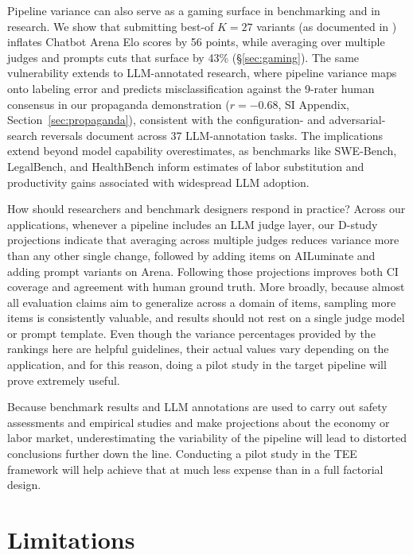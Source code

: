 \documentclass{article}
\begin{document}
Pipeline variance can also serve as a gaming surface in benchmarking and in research. We show that submitting best-of $K{=}27$ variants (as documented in \citet{singh2025leaderboard}) inflates Chatbot Arena Elo scores by 56 points, while averaging over multiple judges and prompts cuts that surface by 43\% (\S\ref{sec:gaming}). The same vulnerability extends to LLM-annotated research, where pipeline variance maps onto labeling error and predicts misclassification against the 9-rater human consensus in our propaganda demonstration ($r = -0.68$, SI Appendix, Section~\ref{sec:propaganda}), consistent with the configuration- and adversarial-search reversals \citet{baumann2025llmhacking} document across 37 LLM-annotation tasks. The implications extend beyond model capability overestimates, as benchmarks like SWE-Bench, LegalBench, and HealthBench inform estimates of labor substitution and productivity gains \citep{eloundou2023gpts} associated with widespread LLM adoption. 




How should researchers and benchmark designers respond in practice? Across our applications, whenever a pipeline includes an LLM judge layer, our D-study projections indicate that averaging across multiple judges reduces variance more than any other single change, followed by adding items on AILuminate and adding prompt variants on Arena. Following those projections improves both CI coverage and agreement with human ground truth. More broadly, because almost all evaluation claims aim to generalize across a domain of items, sampling more items is consistently valuable, and results should not rest on a single judge model or prompt template. Even though the variance percentages provided by the rankings here are helpful guidelines, their actual values vary depending on the application, and for this reason, doing a pilot study in the target pipeline will prove extremely useful.

Because benchmark results and LLM annotations are used to carry out safety assessments and empirical studies and make projections about the economy or labor market, underestimating the variability of the pipeline will lead to distorted conclusions further down the line. Conducting a pilot study in the TEE framework will help achieve that at much less expense than in a full factorial design.



\section{Limitations}
\label{sec:limitations}
\end{document}
